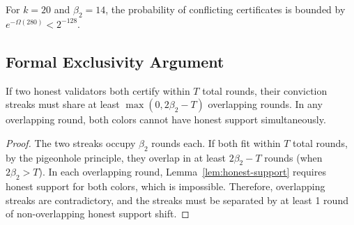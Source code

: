 \begin{corollary}
\label{cor:safety-bound}
For $k = 20$ and $\beta_2 = 14$, the probability of conflicting certificates is
bounded by $e^{-\Omega(280)} < 2^{-128}$.
\end{corollary}

\subsection{Formal Exclusivity Argument}

\begin{proposition}
\label{prop:pigeonhole}
If two honest validators both certify within $T$ total rounds, their conviction
streaks must share at least $\max(0, 2\beta_2 - T)$ overlapping rounds. In any
overlapping round, both colors cannot have honest support simultaneously.
\end{proposition}

\begin{proof}
The two streaks occupy $\beta_2$ rounds each. If both fit within $T$ total rounds,
by the pigeonhole principle, they overlap in at least $2\beta_2 - T$ rounds (when
$2\beta_2 > T$). In each overlapping round, Lemma~\ref{lem:honest-support} requires
honest support for both colors, which is impossible. Therefore, overlapping streaks
are contradictory, and the streaks must be separated by at least 1 round of non-overlapping
honest support shift.
\end{proof}

